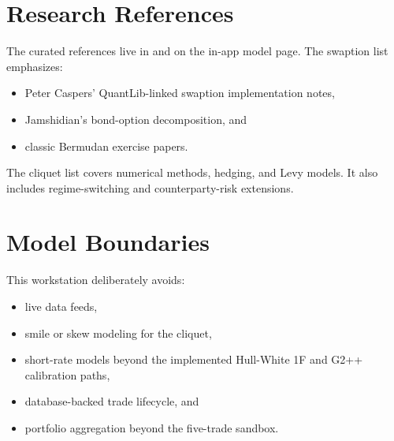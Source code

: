 \documentclass[conference]{IEEEtran}
\begin{document}
\section{Research References}
The curated references live in  and on the in-app model page. The swaption list emphasizes:
\begin{itemize}[leftmargin=1.5em]
    \item Peter Caspers' QuantLib-linked swaption implementation notes,
    \item Jamshidian's bond-option decomposition, and
    \item classic Bermudan exercise papers.
\end{itemize}
The cliquet list covers numerical methods, hedging, and Levy models. It also
includes regime-switching and counterparty-risk extensions.

\section{Model Boundaries}
This workstation deliberately avoids:
\begin{itemize}[leftmargin=1.5em]
    \item live data feeds,
    \item smile or skew modeling for the cliquet,
    \item short-rate models beyond the implemented Hull-White 1F and G2++ calibration paths,
    \item database-backed trade lifecycle, and
    \item portfolio aggregation beyond the five-trade sandbox.
\end{itemize}
\end{document}
